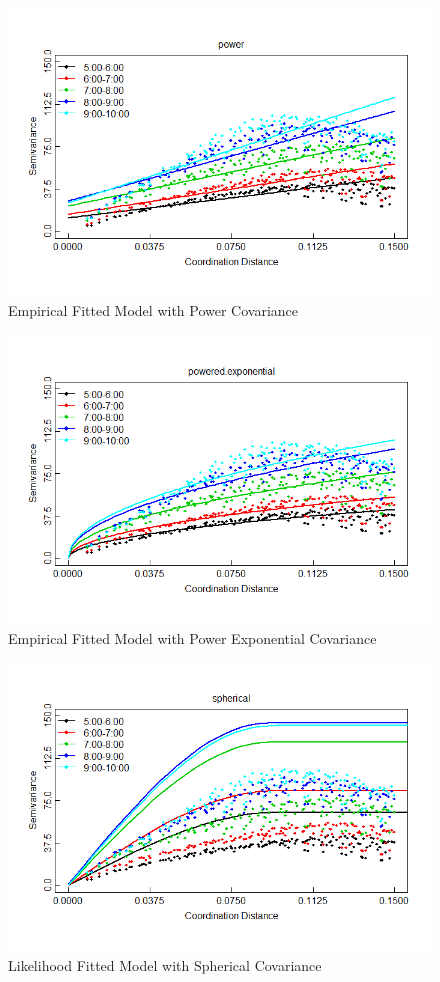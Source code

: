 \documentclass[hidelinks,12pt]{article}
\begin{document}
	\begin{figure}[!ht]
		\includegraphics[width=\textwidth]{semfit_power.png}
		\caption{Empirical Fitted Model with Power Covariance \label{fig:sempow}}
	\end{figure}
	\begin{figure}[!ht]
		\includegraphics[width=\textwidth]{semfit_poweredexp.png}
		\caption{Empirical Fitted Model with Power Exponential Covariance \label{fig:sempex}}
	\end{figure}
	\begin{figure}[!ht]
		\includegraphics[width=\textwidth]{lik_spherical.png}
		\caption{Likelihood Fitted Model with Spherical Covariance \label{fig:liksph}}
	\end{figure}
\end{document}
